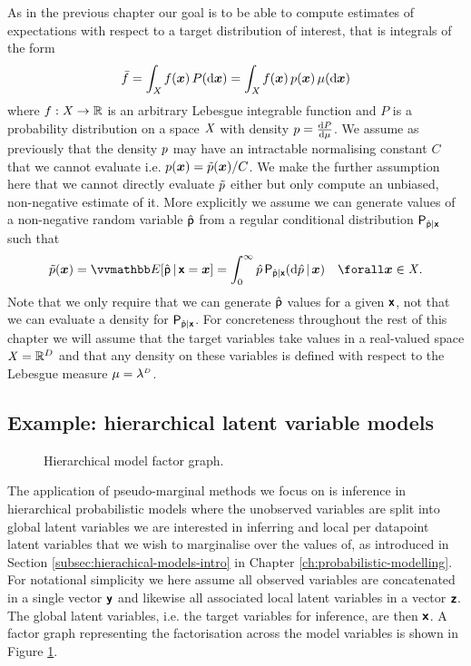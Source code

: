 As in the previous chapter our goal is to be able to compute estimates of expectations with respect to a target distribution of interest, that is integrals of the form
\begin{equation}
  \bar{f} = \int_{\mathit{X}} f(\boldsymbol{x})\,P(\mathrm{d} \boldsymbol{x}) = \int_{\mathit{X}} f(\boldsymbol{x})\,p(\boldsymbol{x})\,\mu(\mathrm{d}\boldsymbol{x})
\end{equation}
where $f : \mathit{X} \to \mathbb{R}$ is an arbitrary Lebesgue integrable function and $P$ is a probability distribution on a space $\mathit{X}$ with density $p = \frac{\mathrm{d} P}{\mathrm{d} \mu}$. We assume as previously that the density $p$ may have an intractable normalising constant $C$ that we cannot evaluate i.e. $p(\boldsymbol{x}) = \tilde{p}(\boldsymbol{x}) / C$. We make the further assumption here that we cannot directly evaluate $\tilde{p}$ either but only compute an unbiased, non-negative estimate of it. More explicitly we assume we can generate values of a non-negative random variable $\hat{\mathsf{p}}$ from a regular conditional distribution $\mathsf{P}_{\hat{\mathsf{p}}|\boldsymbol{\mathsf{x}}}$ such that
\begin{equation}\label{eq:pm-density-unbiased-estimator}
  \utgtdens(\vct{x}) = \expc{ \hat{\rvar{p}} \gvn \rvct{x} = \vct{x}}
  = \int_{0}^{\infty} \hat{p} \, \prob{\hat{\rvar{p}}|\rvct{x}}(\dr\hat{p}\gvn\vct{x})
  \quad \forall \vct{x} \in \set{X}.
\end{equation}
Note that we only require that we can generate $\hat{\mathsf{p}}$ values for a given $\boldsymbol{\mathsf{x}}$, not that we can evaluate a density for $\mathsf{P}_{\hat{\mathsf{p}}|\boldsymbol{\mathsf{x}}}$. For concreteness throughout the rest of this chapter we will assume that the target variables take values in a real-valued space $\mathit{X} = \mathbb{R}^D$ and that any density on these variables is defined with respect to the Lebesgue measure $\mu = \lebm{D}$.

\subsection{Example: hierarchical latent variable models}

\begin{figure}[!t]
\centering
{}
\caption{Hierarchical model factor graph.}
\label{fig:global-local-latent-variable-model}
\end{figure}

The application of pseudo-marginal methods we focus on is inference in hierarchical probabilistic models where the unobserved variables are split into global latent variables we are interested in inferring and local per datapoint latent variables that we wish to marginalise over the values of, as introduced in Section \ref{subsec:hierachical-models-intro} in Chapter \ref{ch:probabilistic-modelling}. For notational simplicity we here assume all observed variables are concatenated in a single vector $\boldsymbol{\mathsf{y}}$ and likewise all associated local latent variables in a vector $\boldsymbol{\mathsf{z}}$. The global latent variables, i.e. the target variables for inference, are then $\boldsymbol{\mathsf{x}}$. A factor graph representing the factorisation across the model variables is shown in Figure \ref{fig:global-local-latent-variable-model}.

